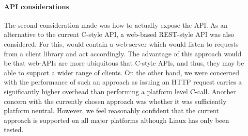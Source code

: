 \paragraph{API considerations}
The second consideration made was how to actually expose the API. As an
alternative to the current C-style API, a web-based REST-style API was also
considered. For this, \libsme{} would contain a web-server which would
listen to requests from a client library and act accordingly. The advantage of
this approach would be that web-APIs are more ubiquitous that C-style APIs, and
thus, they may be able to support a wider range of clients. On the other hand,
we were concerned with the performance of such an approach as issuing an HTTP
request carries a significantly higher overhead than performing a platform level
C-call. Another concern with the currently chosen approach was whether it was
sufficiently platform neutral. However, we feel reasonably confident that the
current approach is supported on all major platforms although Linux has only
been tested.


